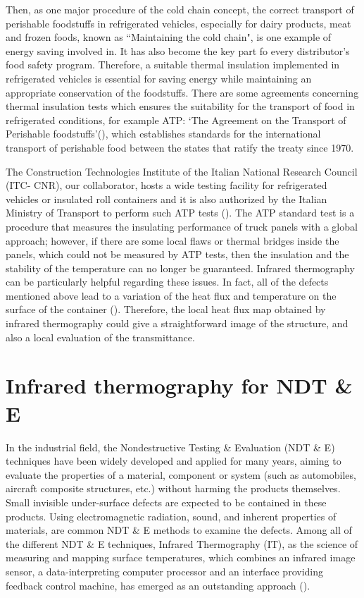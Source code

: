 Then, as one major procedure of the cold chain concept, the correct transport of perishable foodstuffs in refrigerated vehicles, especially for dairy products, meat and frozen foods, known as ``Maintaining the cold chain", is one example of energy saving involved in. It has also become the key part fo every distributor's food safety program. Therefore, a suitable thermal insulation implemented in refrigerated vehicles is essential for saving energy while maintaining an appropriate conservation of the foodstuffs. There are some agreements concerning thermal insulation tests which ensures the suitability for the transport of food in refrigerated conditions, for example ATP: ‘The Agreement on the Transport of Perishable foodstuffs’(\citet{Geneva1970}), which establishes standards for the international transport of perishable food between the states that ratify the treaty since 1970.

The Construction Technologies Institute of the Italian National Research Council (ITC- CNR), our collaborator, hosts a wide testing facility for refrigerated vehicles or insulated roll containers and it is also authorized by the Italian Ministry of Transport to perform such ATP tests (\citet{Tassou2009,dragano2009experimental}). The ATP standard test is a procedure that measures the insulating performance of truck panels with a global approach; however, if there are some local flaws or thermal bridges inside the panels, which could not be measured by ATP tests, then the insulation and the stability of the temperature can no longer be guaranteed. Infrared thermography can be particularly helpful regarding these issues. In fact, all of the defects mentioned above lead to a variation of the heat flux and temperature on the surface of the container (\citet{grinzato2010r, grinzatoquality, grinzato1comparison}). Therefore, the local heat flux map obtained by infrared thermography could give a straightforward image of the structure, and also a local evaluation of the transmittance.

\section{Infrared thermography for NDT \& E}
In the industrial field, the Nondestructive Testing \& Evaluation (NDT \& E) techniques have been  widely developed and applied for many years, aiming to evaluate the properties of a material, component or system (such as automobiles, aircraft composite structures, etc.) without harming the products themselves. Small invisible under-surface defects are expected to be contained in these products. Using electromagnetic radiation, sound, and inherent properties of materials, are common NDT \& E methods to examine the defects. Among all of the different NDT \& E techniques, Infrared Thermography (IT), as the science of measuring and mapping surface temperatures, which combines an infrared image sensor, a data-interpreting computer processor and an interface providing feedback control machine, has emerged as an  outstanding approach (\citet{maldague3introduction,cielo1987thermographie,Maldague2001theory,stanley1994non,pradere2009microscale,avdelidis2004applications}).

